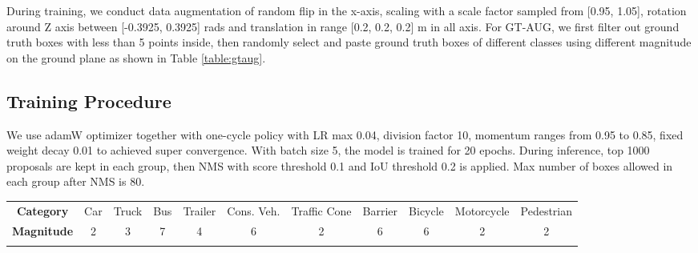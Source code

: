 \documentclass[10pt,twocolumn,letterpaper]{article}
\begin{document}
During training, we conduct data augmentation of random flip in the x-axis, scaling with a scale factor sampled from [0.95, 1.05], rotation around Z axis between [-0.3925, 0.3925] rads and translation in range [0.2, 0.2, 0.2] m in all axis. For GT-AUG, we first filter out ground truth boxes with less than 5 points inside, then randomly select and paste ground truth boxes of different classes using different magnitude on the ground plane as shown in Table \ref{table:gtaug}.



\subsection{Training Procedure}
We use adamW \cite{DBLP:journals/corr/abs-1711-05101} optimizer together with one-cycle policy \cite{OneCyclePolicySylvainGugger} with LR max 0.04, division factor 10, momentum ranges from 0.95 to 0.85, fixed weight decay 0.01 to achieved super convergence. With batch size 5, the model is trained for 20 epochs. During inference, top 1000 proposals are kept in each group, then NMS with score threshold 0.1 and IoU threshold 0.2 is applied. Max number of boxes allowed in each group after NMS is 80. 


\begin{table*}[t] 
\begin{center}    
\begin{tabular}{c|c|c|c|c|c|c|c|c|c|c}
    \Xhline{0.8pt}
    \textbf{Category} & Car & Truck & Bus & Trailer & Cons. Veh. & Traffic Cone & Barrier & Bicycle & Motorcycle & Pedestrian \\
    \Xhline{0.8pt}

    \textbf{Magnitude} & 2 & 3 & 7 & 4 & 6 & 2 & 6 & 6 & 2 & 2 \\
    \Xhline{0.8pt}
\end{tabular}
\end{center}
\caption{\textbf{GT-AUG magnitudes of different categories.} For each category, the magnitude means number of instances placed into a point cloud sample.}
\label{table:gtaug}
\end{table*}
\end{document}
